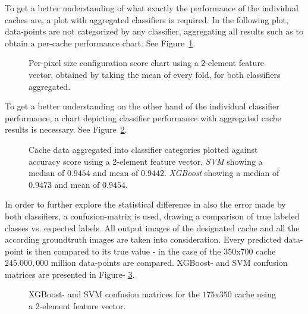 To get a better understanding of what exactly the performance of the individual caches are, a plot with aggregated classifiers is required. In the following plot, data-points are not categorized by any classifier, aggregating all results such as to obtain a per-cache performance chart. See Figure~\ref{fig:cache-performance}.

\begin{figure}[ht]
  \centering
  
  \caption{Per-pixel size configuration score chart using a 2-element feature vector, obtained by taking the mean of every fold, for both classifiers aggregated.
  }\label{fig:cache-performance}
\end{figure}

To get a better understanding on the other hand of the individual classifier performance, a chart depicting classifier performance with aggregated cache results is necessary. See Figure~\ref{fig:classifier-performance}.

\begin{figure}[ht]
  \centering
  
  \caption{Cache data aggregated into classifier categories plotted against accuracy score using a 2-element feature vector. \textit{SVM} showing a median of $0.9454$ and mean of $0.9442$. \textit{XGBoost} showing a median of $0.9473$ and mean of $0.9454$.
  }\label{fig:classifier-performance}
\end{figure}

In order to further explore the statistical difference in also the error made by both classifiers, a confusion-matrix is used, drawing a comparison of true labeled classes vs. expected labels. All output images of the designated cache and all the according groundtruth images are taken into consideration. Every predicted data-point is then compared to its true value - in the case of the 350x700 cache $245.000,000$ million data-points are compared. XGBoost- and SVM confusion matrices are presented in Figure- \ref{fig:confusion-matrices}.

\begin{figure}[ht]
  \centering
  
  
  \caption{XGBoost- and SVM confusion matrices for the $175$x$350$ cache using a 2-element feature vector.
  }\label{fig:confusion-matrices}
\end{figure}

